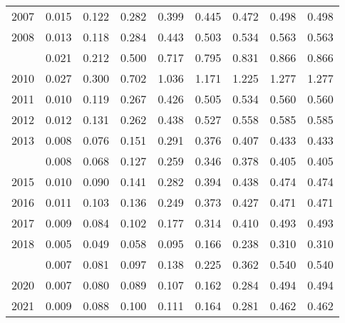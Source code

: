 \documentclass[
]{article}
\begin{document}
\begin{longtable}[t]{lrrrrrrrr}
2007 & 0.015 & 0.122 & 0.282 & 0.399 & 0.445 & 0.472 & 0.498 & 0.498\\
2008 & 0.013 & 0.118 & 0.284 & 0.443 & 0.503 & 0.534 & 0.563 & 0.563\\
\addlinespace
2009 & 0.021 & 0.212 & 0.500 & 0.717 & 0.795 & 0.831 & 0.866 & 0.866\\
2010 & 0.027 & 0.300 & 0.702 & 1.036 & 1.171 & 1.225 & 1.277 & 1.277\\
2011 & 0.010 & 0.119 & 0.267 & 0.426 & 0.505 & 0.534 & 0.560 & 0.560\\
2012 & 0.012 & 0.131 & 0.262 & 0.438 & 0.527 & 0.558 & 0.585 & 0.585\\
2013 & 0.008 & 0.076 & 0.151 & 0.291 & 0.376 & 0.407 & 0.433 & 0.433\\
\addlinespace
2014 & 0.008 & 0.068 & 0.127 & 0.259 & 0.346 & 0.378 & 0.405 & 0.405\\
2015 & 0.010 & 0.090 & 0.141 & 0.282 & 0.394 & 0.438 & 0.474 & 0.474\\
2016 & 0.011 & 0.103 & 0.136 & 0.249 & 0.373 & 0.427 & 0.471 & 0.471\\
2017 & 0.009 & 0.084 & 0.102 & 0.177 & 0.314 & 0.410 & 0.493 & 0.493\\
2018 & 0.005 & 0.049 & 0.058 & 0.095 & 0.166 & 0.238 & 0.310 & 0.310\\
\addlinespace
2019 & 0.007 & 0.081 & 0.097 & 0.138 & 0.225 & 0.362 & 0.540 & 0.540\\
2020 & 0.007 & 0.080 & 0.089 & 0.107 & 0.162 & 0.284 & 0.494 & 0.494\\
2021 & 0.009 & 0.088 & 0.100 & 0.111 & 0.164 & 0.281 & 0.462 & 0.462\\*
\end{longtable}
\end{document}
